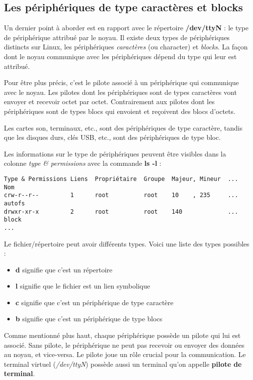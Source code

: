 \subsection{Les périphériques de type caractères et blocks}
Un dernier point à aborder est en rapport avec le répertoire \textbf{/dev/ttyN} : le type de périphérique attribué par le noyau. Il existe deux types de périphériques distincts sur Linux, les périphériques \textit{caractères} (ou character) et \textit{blocks}. La façon dont le noyau communique avec les périphériques dépend du type qui leur est attribué.

Pour être plus précis, c'est le pilote associé à un périphérique qui communique avec le noyau. Les pilotes dont les périphériques sont de types caractères vont envoyer et recevoir octet par octet. Contrairement aux pilotes dont les périphériques sont de types blocs qui envoient et reçoivent des blocs d'octets.

Les cartes son, terminaux, etc., sont des périphériques de type caractère, tandis que les disques durs, clés USB, etc., sont des périphériques de type bloc.

Les informations sur le type de périphériques peuvent être visibles dans la colonne \textit{type \& permissions} avec la commande \textbf{ls -l} :

\begin{verbatim}
Type & Permissions Liens  Propriétaire  Groupe  Majeur, Mineur  ...  Nom
crw-r--r--         1      root          root    10    , 235     ...   autofs
drwxr-xr-x         2      root          root    140             ...   block
...
\end{verbatim}

\newpage

Le fichier/répertoire peut avoir différents types. Voici une liste des types possibles :

\begin{itemize}
	\item \textbf{d} signifie que c'est un répertoire
	\item \textbf{l} signifie que le fichier est un lien symbolique
	\item \textbf{c} signifie que c'est un périphérique de type caractère
	\item \textbf{b} signifie que c'est un périphérique de type blocs
\end{itemize}

Comme mentionné plus haut, chaque périphérique possède un pilote qui lui est associé. Sans pilote, le périphérique ne peut pas recevoir ou envoyer des données au noyau, et vice-versa. Le pilote joue un rôle crucial pour la communication. Le terminal virtuel (\textit{/dev/ttyN}) possède aussi un terminal qu'on appelle \textbf{pilote de terminal}.

